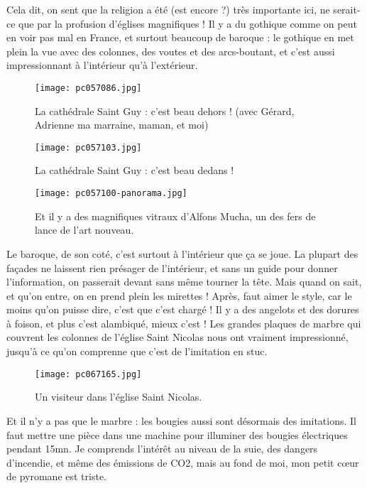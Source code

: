 \documentclass{book}
\begin{document}
Cela dit, on sent que la religion a été (est encore ?) très importante ici, ne serait-ce que par la profusion d'églises magnifiques ! Il y a du gothique comme on peut en voir pas mal en France, et surtout beaucoup de baroque : le gothique en met plein la vue avec des colonnes, des voutes et des arcs-boutant, et c'est aussi impressionnant à l'intérieur qu'à l'extérieur.


\begin{figure}[h]
\centering
\texttt{[image: pc057086.jpg]}
\caption*{La cathédrale Saint Guy : c'est beau dehors ! (avec Gérard, Adrienne ma marraine, maman, et moi)}
\end{figure}


\begin{figure}[h]
\centering
\texttt{[image: pc057103.jpg]}
\caption*{La cathédrale Saint Guy : c'est beau dedans !}
\end{figure}


\begin{figure}[h]
\centering
\texttt{[image: pc057100-panorama.jpg]}
\caption*{Et il y a des magnifiques vitraux d'Alfons  Mucha, un des fers de lance de l'art nouveau.}
\end{figure}

Le baroque, de son coté, c'est surtout à l'intérieur que ça se joue. La plupart des façades ne laissent rien présager de l'intérieur, et sans un guide pour donner l'information, on passerait devant sans même tourner la tête. Mais quand on sait, et qu'on entre, on en prend plein les mirettes ! Après, faut aimer le style, car le moins qu'on puisse dire, c'est que c'est chargé ! Il y a des angelots et des dorures à foison, et plus c'est alambiqué, mieux c'est ! Les grandes plaques de marbre qui couvrent les colonnes de l'église Saint Nicolas nous ont vraiment impressionné, jusqu'à ce qu'on comprenne que c'est de l'imitation en stuc.



\begin{figure}[h]
\centering
\texttt{[image: pc067165.jpg]}
\caption*{Un visiteur dans l'église Saint Nicolas.}
\end{figure}

Et il n'y a pas que le marbre : les bougies aussi sont désormais des imitations. Il faut mettre une pièce dans une machine pour illuminer des bougies électriques pendant 15mn. Je comprends l'intérêt au niveau de la suie, des dangers d'incendie, et même des émissions de CO2, mais au fond de moi, mon petit cœur de pyromane est triste.
\end{document}
